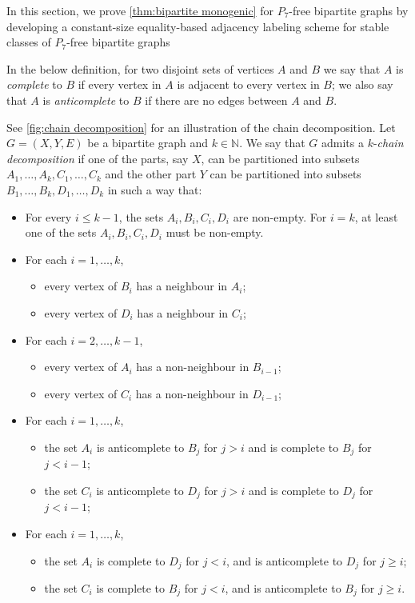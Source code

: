 \documentclass{theoretics}
\newcommand{\bN}{\ensuremath{\mathbb{N}}}
\newcommand{\decomp}{chain\xspace}
\begin{document}
In this section, we prove \cref{thm:bipartite monogenic} for $P_7$-free bipartite graphs
by developing a constant-size equality-based adjacency labeling scheme for stable classes of $P_7$-free bipartite graphs 

In the below definition, for two disjoint sets of vertices $A$ and $B$ we say 
that $A$ is \emph{complete} to $B$ if every vertex in $A$ is adjacent to every vertex in $B$; we also say that $A$ is  \emph{anticomplete} to $B$ if there are no edges between $A$ and $B$.

\begin{definition}
\label{def: chain decomp}
See \cref{fig:chain decomposition} for an illustration of the chain decomposition.
Let $G=(X,Y,E)$ be a bipartite graph and $k \in \bN$.  We say that $G$ admits a $k$-\textit{\decomp
decomposition} if one of the parts, say $X$, can be partitioned into subsets $A_1, \ldots, A_k, C_1,
\ldots, C_k$ and the other part $Y$ can be partitioned into subsets $B_1, \ldots, B_k, D_1, \ldots,
D_k$ in such a way that:
	\begin{itemize}
		\item For every $i \leq k-1$, the sets $A_i, B_i,C_i,D_i$ are non-empty. For $i=k$, at least one of the sets $A_i, B_i,C_i,D_i$ must be non-empty.
		\item For each $i =1, \ldots, k$, 
		\begin{itemize}
			\item every vertex of $B_i$ has a neighbour in $A_i$; 
			\item every vertex of $D_i$ has a neighbour in $C_i$;
		\end{itemize}
		\item For each $i = 2, \ldots, k-1$, 
		\begin{itemize}
			\item every vertex of  $A_i$ has a non-neighbour in $B_{i-1}$;
			\item	every vertex of $C_i$ has a non-neighbour in $D_{i-1}$;
		\end{itemize}		
		\item For each $i = 1, \ldots, k$, 
		\begin{itemize}
			\item the set $A_i$ is anticomplete to $B_j$ for $j > i$ and
			is complete to $B_j$ for $j < i-1$; 
			\item the set $C_i$ is anticomplete to $D_j$ for $j > i$ and
			is complete to $D_j$ for $j < i-1$;
		\end{itemize}
		\item For each $i = 1, \ldots, k$, 
		\begin{itemize}
			\item the set $A_i$ is complete to $D_j$ for $j < i$, and is anticomplete to
			$D_j$ for $j \geq i$; 
			\item	the set $C_i$ is complete to $B_j$ for $j < i$, and is anticomplete to $B_j$ for $j \geq i$.
		\end{itemize}
	\end{itemize}
\end{definition}
\end{document}
